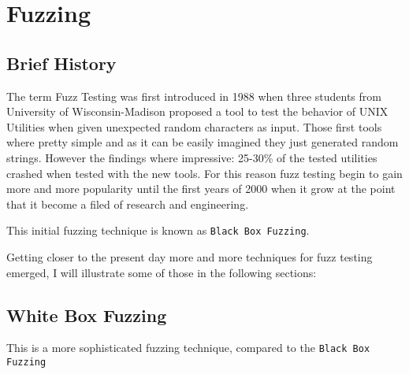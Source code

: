 \documentclass[../main.tex]{subfiles}
\begin{document}
\chapter{Fuzzing}
\section{Brief History}

The term Fuzz Testing was first introduced in 1988 when three students from University of Wisconsin-Madison
proposed a tool to test the behavior of UNIX Utilities when given unexpected random characters as input. \cite{firstFuzzPaper}
Those first tools where pretty simple and as it can be easily imagined they just generated random strings.
However the findings where impressive: 25-30\% of the tested utilities crashed when tested with the new tools.
For this reason fuzz testing begin to gain more and more popularity until the first years of 2000 when it grow at the point
that it become a filed of research and engineering.

This initial fuzzing technique is known as \texttt{Black Box Fuzzing}.

Getting closer to the present day more and more techniques for fuzz testing emerged, I will illustrate some of those in the following
sections:

\section{White Box Fuzzing}
This is a more sophisticated fuzzing technique, compared to the \texttt{Black Box Fuzzing} 

\end{document}
